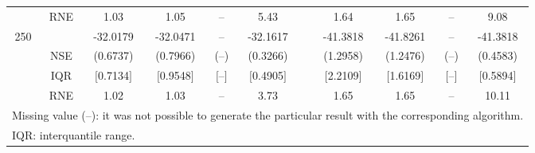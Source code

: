 {{\begin{longtable}{ccccccccccc}
  & RNE &   1.03 &   1.05 &    -- &   5.43 &  &  1.64 &   1.65 &     -- &   9.08   \\ [1ex] 
250 & & -32.0179 & -32.0471 & -- & -32.1617 & & -41.3818 & -41.8261 & -- & -41.3818  \\ 
  & NSE & (0.6737) & (0.7966) & (--) & (0.3266) & & (1.2958) & (1.2476) & (--) & (0.4583)   \\ 
 & IQR & $[$0.7134$]$ & $[$0.9548$]$ & $[$--$]$& $[$0.4905$]$ & & $[$2.2109$]$ & $[$1.6169$]$  &$[$--$]$& $[$0.5894$]$  \\  
  & RNE &   1.02 &   1.03 &    -- &   3.73 &  &  1.65 &   1.65 &     -- &  10.11   \\ [1ex] 
\hline 
  \multicolumn{11}{l}{\footnotesize{Missing value (--): it was not possible to generate the particular result with the corresponding algorithm.}} \\ 
  \multicolumn{11}{l}{\footnotesize{IQR: interquantile range.}} \\ 
\end{longtable} 
} 
} 
\normalsize 
